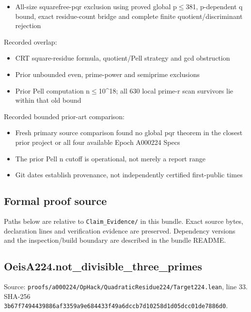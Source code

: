 \documentclass[11pt,a4paper]{article}
\begin{document}
\begin{itemize}
\item All-size squarefree-pqr exclusion using proved global p\ensuremath{\leq}381, p-dependent q bound, exact residue-count bridge and complete finite quotient/discriminant rejection
\end{itemize}
Recorded overlap:

\begin{itemize}
\item CRT square-residue formula, quotient/Pell strategy and gcd obstruction
\end{itemize}
\begin{itemize}
\item Prior unbounded even, prime-power and semiprime exclusions
\end{itemize}
\begin{itemize}
\item Prior Pell computation n\ensuremath{\leq}10\textasciicircum{}18; all 630 local prime-r scan survivors lie within that old bound
\end{itemize}
Recorded bounded prior-art comparison:

\begin{itemize}
\item Fresh primary source comparison found no global pqr theorem in the closest prior project or all four available Epoch A000224 Specs
\end{itemize}
\begin{itemize}
\item The prior Pell n cutoff is operational, not merely a report range
\end{itemize}
\begin{itemize}
\item Git dates establish provenance, not independently certified first-public times
\end{itemize}
\subsection{Formal proof source}
Paths below are relative to \texttt{Claim\_Evidence/} in this bundle. Exact source bytes, declaration lines and verification evidence are preserved. Dependency versions and the inspection/build boundary are described in the bundle README.

\subsection{OeisA224.not\_divisible\_three\_primes}
Source: \texttt{proofs/a000224/OpHack/QuadraticResidue224/Target224.lean}, line 33. SHA-256 \texttt{3b67f7494439886af3359a9e684433f49a6dccb7d10258d1d05dcc01de7886d0}.
\end{document}
